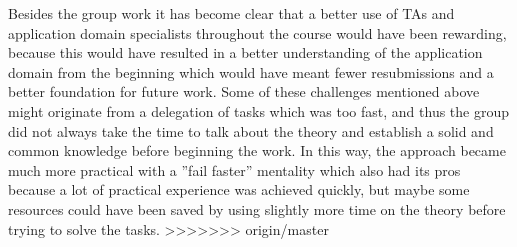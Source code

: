 Besides the group work it has become clear that a better use of TAs and application domain specialists throughout the course would have been rewarding, because this would have resulted in a better understanding of the application domain from the beginning which would have meant fewer resubmissions and a better foundation for future work. 
Some of these challenges mentioned above might originate from a delegation of tasks which was too fast, and thus the group did not always take the time to talk about the theory and establish a solid and common knowledge before beginning the work. In this way, the approach became much more practical with a ''fail faster'' mentality which also had its pros because a lot of practical experience was achieved quickly, but maybe some resources could have been saved by using slightly more time on the theory before trying to solve the tasks.
>>>>>>> origin/master
